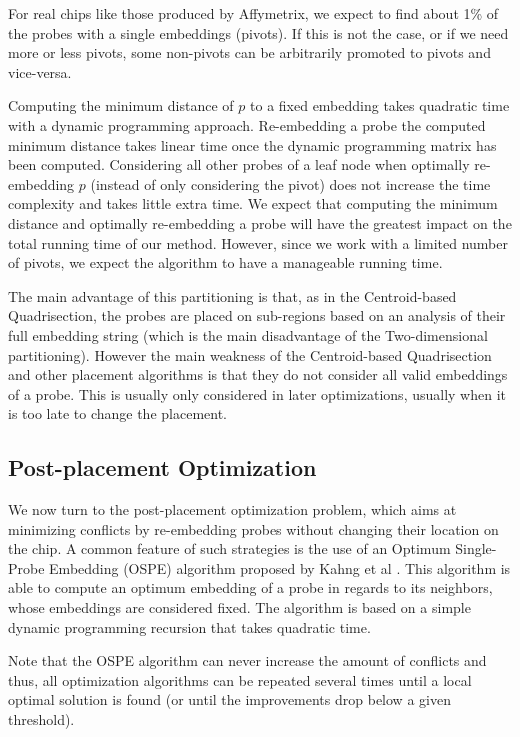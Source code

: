 \documentclass{article}
\begin{document}
For real chips like those produced by Affymetrix, we expect to find about 1\% of the probes with a single embeddings (pivots). If this is not the case, or if we need more or less pivots, some non-pivots can be arbitrarily promoted to pivots and vice-versa.

Computing the minimum distance of $p$ to a fixed embedding takes quadratic time with a dynamic programming approach. Re-embedding a probe the computed minimum distance takes linear time once the dynamic programming matrix has been computed. Considering all other probes of a leaf node when optimally re-embedding $p$ (instead of only considering the pivot) does not increase the time complexity and takes little extra time. We expect that computing the minimum distance and optimally re-embedding a probe will have the greatest impact on the total running time of our method. However, since we work with a limited number of pivots, we expect the algorithm to have a manageable running time.

The main advantage of this partitioning is that, as in the Centroid-based Quadrisection, the probes are placed on sub-regions based on an analysis of their full embedding string (which is the main disadvantage of the Two-dimensional partitioning). However the main weakness of the Centroid-based Quadrisection and other placement algorithms is that they do not consider all valid embeddings of a probe. This is usually only considered in later optimizations, usually when it is too late to change the placement.

\subsection{Post-placement Optimization}

We now turn to the post-placement optimization problem, which aims at minimizing conflicts by re-embedding probes without changing their location on the chip. A common feature of such strategies is the use of an Optimum Single-Probe Embedding (OSPE) algorithm proposed by Kahng et al \cite{KAHNG03}. This algorithm is able to compute an optimum embedding of a probe in regards to its neighbors, whose embeddings are considered fixed. The algorithm is based on a simple dynamic programming recursion that takes quadratic time. 

Note that the OSPE algorithm can never increase the amount of conflicts and thus, all optimization algorithms can be repeated several times until a local optimal solution is found (or until the improvements drop below a given threshold). 
\end{document}
